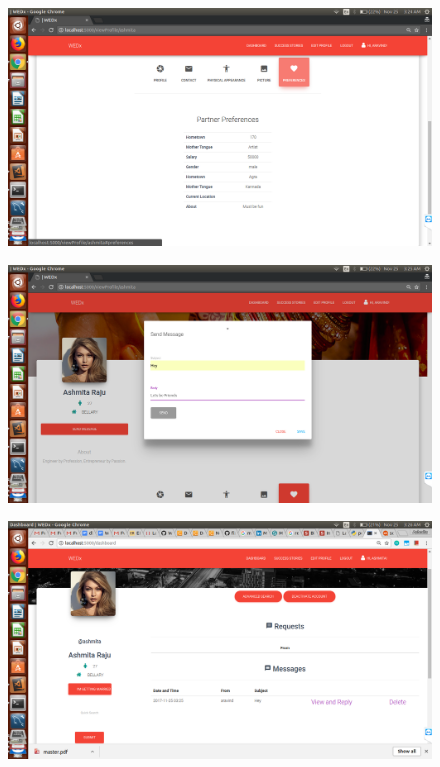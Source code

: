 \documentclass[12pt]{report}
\begin{document}
\begin{figure}[!htb]
    \centering
    \includegraphics[width=1\textwidth]{sc-15.png}
\end{figure}

\begin{figure}[!htb]
    \centering
    \includegraphics[width=1\textwidth]{sc-16.png}
\end{figure}

\begin{figure}[!htb]
    \centering
    \includegraphics[width=1\textwidth]{sc-17.png}
\end{figure}
\end{document}
